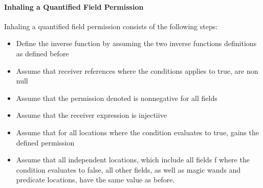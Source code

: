 \documentclass[12pt]{article}
\begin{document}
\paragraph{Inhaling a Quantified Field Permission}
Inhaling a quantified field permission consists of the following steps:
\begin{itemize}
\item Define the inverse function by assuming the two inverse functions definitions as defined before
\item Assume that receiver references where the conditions applies to true, are non null
\item Assume that the permission denoted is nonnegative for all fields
\item Assume that the receiver expression is injectiive
\item Assume that for all locations where the condition evaluates to true, gains the defined permission
\item Assume that all independent locations, which include all fields f where the condition evaluates to false, all other fields, as well as magic wands and predicate locations, have the same value as before.
\end{itemize}
\end{document}
